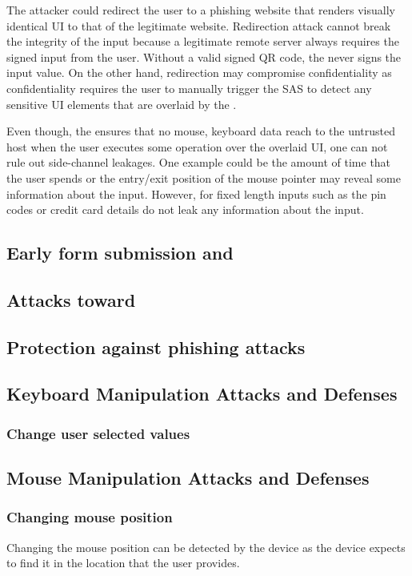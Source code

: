  The attacker could redirect the user to a phishing website that renders visually identical UI to that of the legitimate website. Redirection attack cannot break the integrity of the input because a legitimate remote server always requires the signed input from the user. Without a valid signed QR code, the \device never signs the input value. On the other hand, redirection may compromise confidentiality as confidentiality requires the user to manually trigger the SAS to detect any sensitive UI elements that are overlaid by the \device.

 Even though, the \device ensures that no mouse, keyboard data reach to the untrusted host when the user executes some operation over the overlaid UI, one can not rule out side-channel leakages. One example could be the amount of time that the user spends or the entry/exit position of the mouse pointer may reveal some information about the input. However, for fixed length inputs such as the pin codes or credit card details do not leak any information about the input.


\subsection{Early form submission and }

\subsection{Attacks toward \device}


\iffalse
\subsection{Protection against phishing attacks}
\subsection{Keyboard Manipulation Attacks and Defenses}
\subsubsection{Change user selected values}


\subsection{Mouse Manipulation Attacks and Defenses}
\subsubsection{Changing mouse position}
Changing the mouse position can be detected by the device as the device expects to find it in the location that the user provides. 
